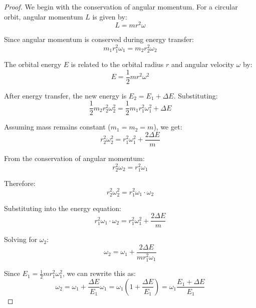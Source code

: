 \begin{proof}
We begin with the conservation of angular momentum. For a circular orbit, angular momentum $L$ is given by:
\begin{equation}
L = mr^2\omega
\end{equation}

Since angular momentum is conserved during energy transfer:
\begin{equation}
m_1r_1^2\omega_1 = m_2r_2^2\omega_2
\end{equation}

The orbital energy $E$ is related to the orbital radius $r$ and angular velocity $\omega$ by:
\begin{equation}
E = \frac{1}{2}mr^2\omega^2
\end{equation}

After energy transfer, the new energy is $E_2 = E_1 + \Delta E$. Substituting:
\begin{equation}
\frac{1}{2}m_2r_2^2\omega_2^2 = \frac{1}{2}m_1r_1^2\omega_1^2 + \Delta E
\end{equation}

Assuming mass remains constant ($m_1 = m_2 = m$), we get:
\begin{equation}
r_2^2\omega_2^2 = r_1^2\omega_1^2 + \frac{2\Delta E}{m}
\end{equation}

From the conservation of angular momentum:
\begin{equation}
r_2^2\omega_2 = r_1^2\omega_1
\end{equation}

Therefore:
\begin{equation}
r_2^2\omega_2^2 = r_1^2\omega_1 \cdot \omega_2
\end{equation}

Substituting into the energy equation:
\begin{equation}
r_1^2\omega_1 \cdot \omega_2 = r_1^2\omega_1^2 + \frac{2\Delta E}{m}
\end{equation}

Solving for $\omega_2$:
\begin{equation}
\omega_2 = \omega_1 + \frac{2\Delta E}{mr_1^2\omega_1}
\end{equation}

Since $E_1 = \frac{1}{2}mr_1^2\omega_1^2$, we can rewrite this as:
\begin{equation}
\omega_2 = \omega_1 + \frac{\Delta E}{E_1}\omega_1 = \omega_1\left(1 + \frac{\Delta E}{E_1}\right) = \omega_1\frac{E_1 + \Delta E}{E_1}
\end{equation}


\end{proof}
